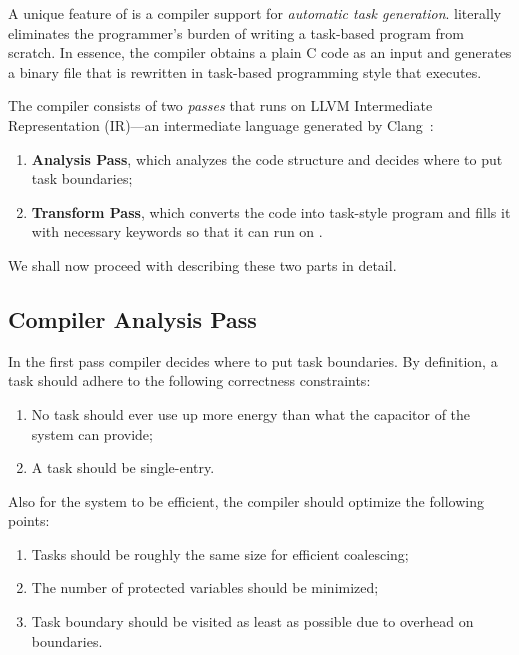 A unique feature of \sys is a compiler support for \emph{automatic task generation}. \sys literally eliminates the programmer's burden of writing a task-based program from scratch. In essence, the \sys compiler obtains a plain C code as an input and generates a binary file that is rewritten in task-based programming style that \sys executes.

The compiler consists of two {\em passes} that runs on LLVM Intermediate Representation (IR)---an intermediate language generated by Clang~\cite{clang_website}:
%
\begin{enumerate}
	\item \textbf{Analysis Pass}, which analyzes the code structure and decides where to put task boundaries;
	\item \textbf{Transform Pass}, which converts the code into task-style program and fills it with necessary \sys keywords so that it can run on \sys.
\end{enumerate}
%
We shall now proceed with describing these two parts in detail.

\subsection{Compiler Analysis Pass}
\label{sec:compiler_analysis_pass}

In the first pass \sys compiler decides where to put task boundaries. By definition, a \sys task should adhere to the following correctness constraints:

\begin{enumerate}[label={\bf C\arabic*:}]
\item{No task should ever use up more energy than what the capacitor of the system can provide;} 
\item{A task should be single-entry.}
\end{enumerate}
%
Also for the system to be efficient, the compiler should optimize the following points:
%
\begin{enumerate}[label={\bf O\arabic*:}]
\item{Tasks should be roughly the same size for efficient coalescing;}
\item{The number of protected variables should be minimized;}
\item{Task boundary should be visited as least as possible due to overhead on boundaries.}
\end{enumerate} 

